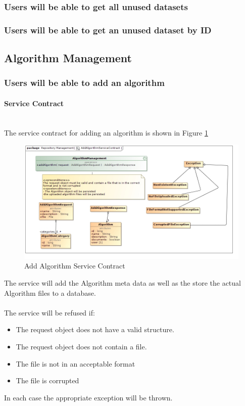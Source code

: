\subsubsection {Users will be able to get all unused datasets}
\subsubsection {Users will be able to get an unused dataset by ID}

\subsection{Algorithm Management}

\subsubsection {Users will be able to add an algorithm}
\paragraph{Service Contract}\\
The service contract for adding an algorithm is shown in Figure \ref{fig:addAlgorithmService}

\begin{figure}[H]
  \begin{center}
  \includegraphics[scale=0.5]{../Diagrams and Charts/Test Data/AddAlgorithmServiceContract.jpg}
  \caption{Add Algorithm Service Contract}
  \label{fig:addAlgorithmService}
  \end{center}  
 \end{figure}

 The service will add the Algorithm meta data as well as the store the
 actual Algorithm files to a database.\\\\
 The service will be refused if:\\
	 \begin{itemize}
	 	\item The request object does not have a valid structure.	 	
	 	\item The request object does not contain a file.
	 	\item The file is not in an acceptable format
	 	\item The file is corrupted
	 \end{itemize}
In each case the appropriate exception will be thrown.
